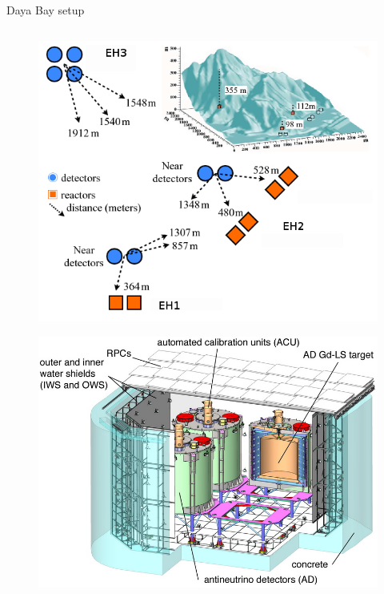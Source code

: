 \documentclass[usenames, dvipsnames]{beamer}
\begin{document}
\begin{frame}[fragile]
\begin{columns}[T]
\begin{column}{.47\textwidth}
\begin{block}{Daya Bay setup}
\begin{columns}[T]
\begin{column}{0.47\textwidth}
\begin{figure}[T]
                \includegraphics[scale=0.8]{./pics/DYBdiag_3.png}
            \end{figure}
            \begin{figure}[b]
                \includegraphics[scale=2.8]{./pics/Fig2_DYB_farhalllabel.png}
            \end{figure}
        \end{column}
    \end{columns}
\end{block}


\end{column}
\end{columns}
\end{frame}
\end{document}
